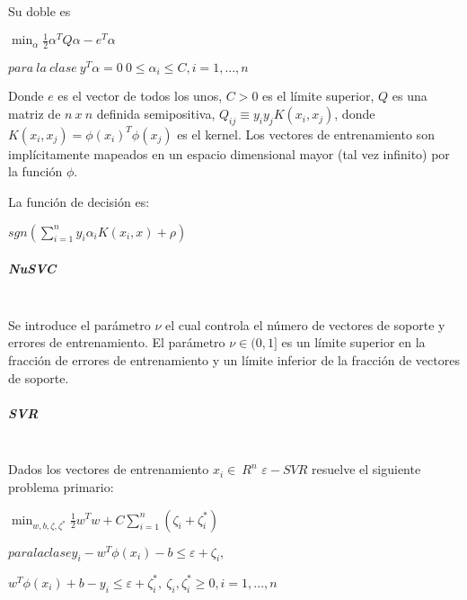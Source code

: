 Su doble es

\begin{center}
	$\min_{\alpha} \frac{1}{2} \alpha^T Q \alpha - e^T \alpha$
\end{center}
\begin{center}
	$para\ la\ clase\ y^T \alpha = 0\ 0 \leq \alpha_i \leq C, i=1, ..., n$
\end{center}

Donde $e$ es el vector de todos los unos, $C > 0$ es el límite superior, $Q$ es una matriz de $n\ x\ n$ definida semipositiva, $Q_{ij} \equiv y_i y_j K(x_i, x_j)$, donde $K(x_i, x_j) = \phi (x_i)^T \phi (x_j)$ es el kernel. Los vectores de entrenamiento son implícitamente mapeados en un espacio dimensional mayor (tal vez infinito) por la función $\phi$.

La función de decisión es:

\begin{center}
	$sgn(\sum_{i=1}^n y_i \alpha_i K(x_i, x) + \rho)$
\end{center}

\subparagraph{NuSVC\\\\}

Se introduce el parámetro $\nu$ el cual controla el número de vectores de soporte y errores de
entrenamiento. El parámetro $\nu \in (0, 1]$ es un límite superior en la fracción de errores de
entrenamiento y un límite inferior de la fracción de vectores de soporte.

\subparagraph{SVR\\\\}

Dados los vectores de entrenamiento  $x_{i} \in\ R^n$  
$\varepsilon-SVR$ \cite{smola2004tutorial} resuelve el siguiente problema primario:

\begin{center}
	
	$\min_ {w, b, \zeta, \zeta^*} \frac{1}{2} w^T w + C \sum_{i=1}^{n} (\zeta_i + \zeta_i^*)
	$
\end{center}

\begin{center}
	
	$para la clase y_i - w^T \phi (x_i) - b \leq \varepsilon + \zeta_i,$
\end{center}
\begin{center}
	$w^T \phi (x_i) + b - y_i \leq \varepsilon + \zeta_i^*,\ \zeta_i, \zeta_i^* \geq 0, i=1, ..., n$	
\end{center}

